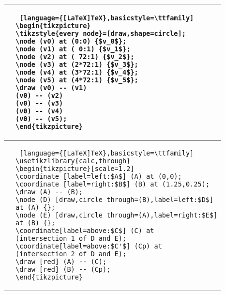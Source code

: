 \begin{note}[Nodes]
\begin{itemize}
\begin{tabular}{c|l}
\begin{tikzpicture}
\tikzstyle{every node}=[draw,shape=circle];
\node (v0) at (0:0) {$v_0$};
\node (v1) at ( 0:1) {$v_1$};
\node (v2) at ( 72:1) {$v_2$};
\node (v3) at (2*72:1) {$v_3$};
\node (v4) at (3*72:1) {$v_4$};
\node (v5) at (4*72:1) {$v_5$};
\draw (v0) -- (v1)
(v0) -- (v2)
(v0) -- (v3)
(v0) -- (v4)
(v0) -- (v5);
\end{tikzpicture} &
\begin{lstlisting} [language={[LaTeX]TeX},basicstyle=\ttfamily]
\begin{tikzpicture}
\tikzstyle{every node}=[draw,shape=circle];
\node (v0) at (0:0) {$v_0$};
\node (v1) at ( 0:1) {$v_1$};
\node (v2) at ( 72:1) {$v_2$};
\node (v3) at (2*72:1) {$v_3$};
\node (v4) at (3*72:1) {$v_4$};
\node (v5) at (4*72:1) {$v_5$};
\draw (v0) -- (v1)
(v0) -- (v2)
(v0) -- (v3)
(v0) -- (v4)
(v0) -- (v5);
\end{tikzpicture}
\end{lstlisting}\\
\hline
\begin{tikzpicture}
\coordinate [label=left:$A$] (A) at (0,0);
\coordinate [label=right:$B$] (B) at (1.25,0.25);
\draw (A) -- (B);
\node (D) [draw,circle through=(B),label=left:$D$] at (A) {};
\node (E) [draw,circle through=(A),label=right:$E$] at (B) {};
\coordinate[label=above:$C$] (C) at (intersection 1 of D and E);
\coordinate[label=above:$C'$] (Cp) at (intersection 2 of D and E);
\draw [red] (A) -- (C);
\draw [red] (B) -- (Cp);
\end{tikzpicture} &
\begin{lstlisting} [language={[LaTeX]TeX},basicstyle=\ttfamily]
\usetikzlibrary{calc,through}
\begin{tikzpicture}[scale=1.2]
\coordinate [label=left:$A$] (A) at (0,0);
\coordinate [label=right:$B$] (B) at (1.25,0.25);
\draw (A) -- (B);
\node (D) [draw,circle through=(B),label=left:$D$]
at (A) {};
\node (E) [draw,circle through=(A),label=right:$E$]
at (B) {};
\coordinate[label=above:$C$] (C) at
(intersection 1 of D and E);
\coordinate[label=above:$C'$] (Cp) at
(intersection 2 of D and E);
\draw [red] (A) -- (C);
\draw [red] (B) -- (Cp);
\end{tikzpicture}
\end{lstlisting}
\end{tabular}
\end{itemize}
\end{note}
	
